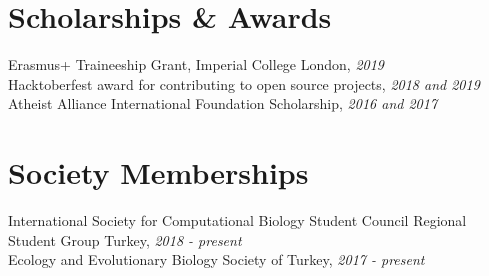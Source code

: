\documentclass[letterpaper,11pt]{article}
\begin{document}
\section{Scholarships \& Awards}
Erasmus+ Traineeship Grant, Imperial College London, \textit{2019} \\
Hacktoberfest award for contributing to open source projects, \textit{2018 and 2019} \\
Atheist Alliance International Foundation Scholarship, \textit{2016 and 2017} \\


\section{Society Memberships}	
International Society for Computational Biology Student Council Regional Student Group Turkey, \textit{2018 - present} \\
Ecology and Evolutionary Biology Society of Turkey, \textit{2017 - present} \\





\usepackage{graphicx}
\graphicspath{ {images/}} %
\usepackage[left=1in, right=1in, bottom=1.25in, top=1.25in]{geometry}
\end{document}
